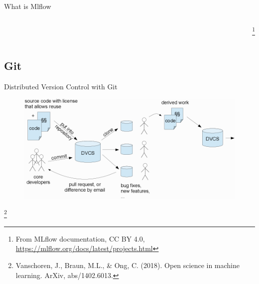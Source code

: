\documentclass[10pt,aspectratio=169]{beamer}
\begin{document}
\begin{frame}{What is Mlflow}
\begin{columns}[c]
\begin{column}{.7\textwidth}
{\begin{figure}
    \end{figure}}
    \end{column}\footnote{From MLflow documentation, CC BY 4.0, \tiny{\url{https://mlflow.org/docs/latest/projects.html}}}
    \end{columns}
\end{frame}

\subsection{Git}
\begin{frame}{Distributed Version Control with Git}
    \begin{figure}
        \includegraphics[width=\textwidth]{figures/tools_git.png}
    \end{figure}\footnote{Vanschoren, J., Braun, M.L., & Ong, C. (2018). Open science in machine learning. ArXiv, abs/1402.6013.}
\end{frame}
\end{document}
